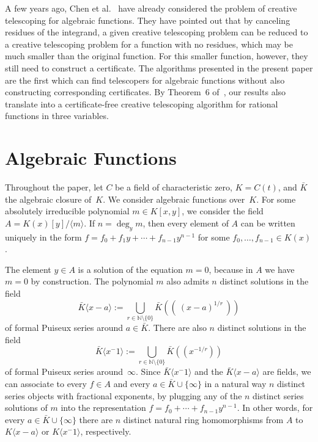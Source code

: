\documentclass{sig-alternate}
\def\<#1>{\langle#1\rangle}
\let\set\mathbb
\begin{document}
A few years ago, Chen et al.~\cite{chen12d} have already considered the problem of creative
telescoping for algebraic functions. They have pointed out that by canceling residues
of the integrand, a given creative telescoping problem can be reduced to a creative
telescoping problem for a function with no residues, which may be much smaller than the
original function. For this smaller function, however, they still need to construct a
certificate. The algorithms presented in the present paper are the first which can find
telescopers for algebraic functions without also constructing corresponding certificates.
By Theorem~6 of~\cite{chen12d}, our results also translate into a certificate-free
creative telescoping algorithm for rational functions in three variables.

\section{Algebraic Functions}

Throughout the paper, let $C$ be a field of characteristic zero, $K=C(t)$, and $\bar K$ the algebraic closure of~$K$.
We consider algebraic functions over~$K$.  For some absolutely irreducible
polynomial $m\in K[x,y]$, we consider the field
$A=K(x)[y]/\<m>$. If $n=\deg_ym$, then every element of $A$ can be written uniquely in the form
$f=f_0+f_1y+\cdots+f_{n-1}y^{n-1}$ for some $f_0,\dots,f_{n-1}\in K(x)$.

The element $y\in A$ is a solution of the equation $m=0$,
because in $A$ we have $m=0$ by construction. The polynomial $m$ also admits
$n$ distinct solutions in the field
\[
  \bar K\<x-a>:=\bigcup_{r\in\set N\setminus\{0\}} \bar K((\ (x-a)^{1/r}\ ))
\]
of formal Puiseux series around $a\in\bar K$. There are also $n$ distinct
solutions in the field
\[
  \bar K\<x^{-1}>:=\bigcup_{r\in\set N\setminus\{0\}} \bar K((x^{-1/r}))
\]
of formal Puiseux series around~$\infty$.
Since $\bar K\<x^{-1}>$ and the $\bar K\<x-a>$ are fields, we can associate to every
$f\in A$ and every $a\in\bar K\cup\{\infty\}$ in a natural way $n$ distinct series
objects with fractional exponents, by plugging any of the $n$ distinct series solutions
of $m$ into the representation $f=f_0+\cdots+f_{n-1}y^{n-1}$.
In other words, for every $a\in\bar K\cup\{\infty\}$ there are $n$ distinct natural
ring homomorphisms from $A$ to $K\<x-a>$ or $K\<x^{-1}>$, respectively.
\end{document}

